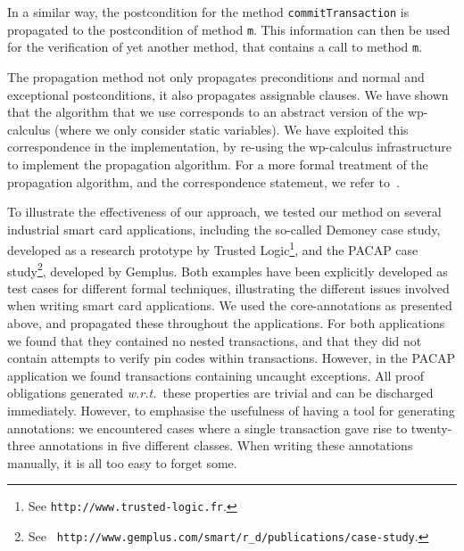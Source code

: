 In a similar way, the postcondition for the method
\texttt{commitTransaction} is propagated to the postcondition of
method \texttt{m}. This information can then be used for the
verification of yet another method, that contains a call to method
\texttt{m}. 

The propagation method not only propagates preconditions and normal
and exceptional postconditions, it also propagates assignable
clauses. We have shown that the algorithm that we use corresponds to
an abstract version of the wp-calculus (where we only consider
static variables). We have exploited this correspondence in the
implementation, by re-using the wp-calculus infrastructure to
implement the propagation algorithm. For a more formal treatment of
the propagation algorithm, and the correspondence statement, we refer
to~\cite{PavlovaBBHL04}.

To illustrate the effectiveness of our approach, we tested our method
on several industrial smart card applications, including the so-called
Demoney case study, developed as a research prototype by Trusted
Logic\footnote{See {\tt http://www.trusted-logic.fr}.}, and the PACAP
case study\footnote{See {\tt
http://www.gemplus.com/smart/r\_d/publications/case-study}.},
developed by Gemplus. Both examples have been explicitly developed as
test cases for different formal techniques, illustrating the different
issues involved when writing smart card applications. We used the
core-annotations as presented above, and propagated these throughout
the applications.  For both applications we found that they contained
no nested transactions, and that they did not contain attempts to
verify pin codes within transactions. However, in the PACAP
application we found transactions containing uncaught exceptions. All
proof obligations generated \emph{w.r.t.}~these properties are trivial
and can be discharged immediately. However, to emphasise the
usefulness of having a tool for generating annotations: we encountered
cases where a single transaction gave rise to twenty-three annotations
in five different classes. When writing these annotations manually, it
is all too easy to forget some.




